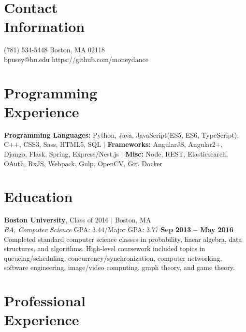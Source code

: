 \documentclass[margin,line]{resume}
\begin{document}
\begin{resume}
    \section{\mysidestyle Contact\\Information}

    (781) 534-5448       \hfill Boston, MA 02118 \\
    \noindent bpusey@bu.edu  \hfill https://github.com/moneydance \vspace{0mm}\\\vspace{-4.5mm}
    
    \section{\mysidestyle Programming\\Experience}

    \textbf{Programming Languages:} Python, Java, JavaScript(ES5, ES6, TypeScript), C++, CSS3, Sass, HTML5, SQL $\vert$
 	\textbf{Frameworks:} AngularJS, Angular2+, Django, Flask, Spring, Express/Nest.js $\vert$
    \textbf{Misc:} Node, REST, Elasticsearch, OAuth, RxJS, Webpack, Gulp, OpenCV, Git, Docker

    \section{\mysidestyle Education}

    \textbf{Boston University}, Class of 2016 $\vert$ Boston, MA \vspace{2mm}\\\vspace{1mm}%
    \textsl{BA, Computer Science} \hfill GPA: 3.44/Major GPA: 3.77 \hfill \textbf{Sep 2013 -- May 2016}\\ Completed standard computer science classes in probability, linear algebra, data structures, and algorithms. High-level coursework included topics in queueing/scheduling, concurrency/synchronization, computer networking, software engineering, image/video computing, graph theory, and game theory.
    \section{\mysidestyle Professional\\Experience}


\end{resume}
\end{document}
